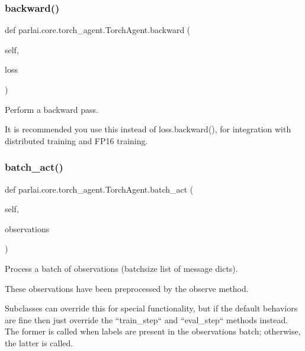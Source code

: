 \subsubsection{\texorpdfstring{backward()}{backward()}}
{\footnotesize\ttfamily def parlai.\+core.\+torch\+\_\+agent.\+Torch\+Agent.\+backward (\begin{DoxyParamCaption}\item[{}]{self,  }\item[{}]{loss }\end{DoxyParamCaption})}

\begin{DoxyVerb}Perform a backward pass.

It is recommended you use this instead of loss.backward(), for integration with
distributed training and FP16 training.
\end{DoxyVerb}
 \mbox{\label{classparlai_1_1core_1_1torch__agent_1_1TorchAgent_a7754a74d6c87590f46e71ec486c285a8}} 
\subsubsection{\texorpdfstring{batch\+\_\+act()}{batch\_act()}}
{\footnotesize\ttfamily def parlai.\+core.\+torch\+\_\+agent.\+Torch\+Agent.\+batch\+\_\+act (\begin{DoxyParamCaption}\item[{}]{self,  }\item[{}]{observations }\end{DoxyParamCaption})}

\begin{DoxyVerb}Process a batch of observations (batchsize list of message dicts).

These observations have been preprocessed by the observe method.

Subclasses can override this for special functionality, but if the
default behaviors are fine then just override the ``train_step`` and
``eval_step`` methods instead. The former is called when labels are
present in the observations batch; otherwise, the latter is called.
\end{DoxyVerb}
 \mbox{\label{classparlai_1_1core_1_1torch__agent_1_1TorchAgent_a4c5824776df0c6cf995984a5e7a3f433}} 
